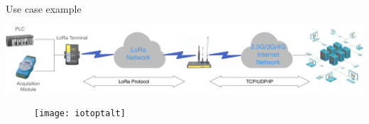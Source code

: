 \begin{frame}{Use case example}

  \includegraphics[page=1,scale=0.2]{res/images/loracellalt}

  \begin{figure}
    \centering
    \texttt{[image: iotoptalt]}
  \end{figure}

\end{frame}